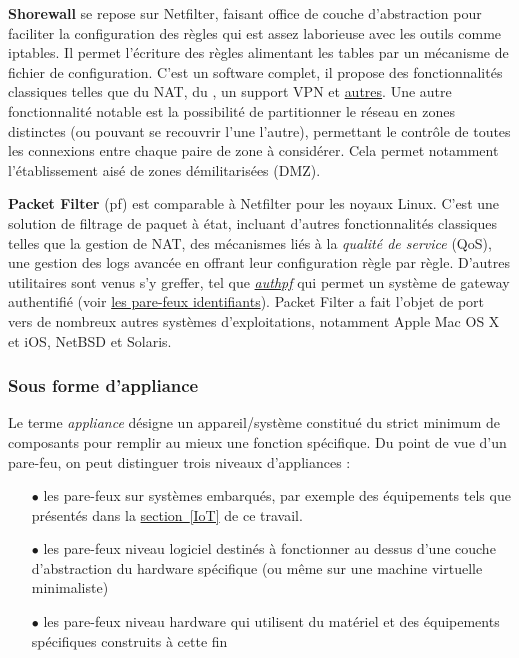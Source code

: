 \documentclass[]{article}
\newcommand{\minit}[1]{\noindent{\small\textbf{ \underline{#1}}}\vspace{0.2cm}}
\newcommand{\wordlink}[2]{\hyperref[#1]{#2~\ref{#1}}}
\begin{document}
\par \textbf{Shorewall} se repose sur Netfilter, faisant office de couche d'abstraction pour faciliter la configuration des règles qui est assez laborieuse avec les outils comme iptables. Il permet l'écriture des règles alimentant les tables par un mécanisme de fichier de configuration. C'est un software complet, il propose des fonctionnalités classiques telles que du NAT, du , un support VPN et \href{http://www.shorewall.net/shorewall_features.htm}{autres}. Une autre fonctionnalité notable est la possibilité de partitionner le réseau en zones distinctes (ou pouvant se recouvrir l'une l'autre), permettant le contrôle de toutes les connexions entre chaque paire de zone à considérer. Cela permet notamment l'établissement aisé de zones démilitarisées (DMZ).\\ 

\minit{BSD}  

\par \textbf{Packet Filter} (pf) est comparable à Netfilter pour les noyaux Linux. C'est une solution de filtrage de paquet à état, incluant d'autres fonctionnalités classiques telles que la gestion de NAT, des mécanismes liés à la \textit{qualité de service} (QoS), une gestion des logs avancée en offrant leur configuration règle par règle. D'autres utilitaires sont venus s'y greffer, tel que \href{https://www.openbsd.org/faq/pf/authpf.html}{\textit{authpf}} qui permet un système de gateway authentifié (voir \href{idfw}{les pare-feux identifiants}). Packet Filter a fait l'objet de port vers de nombreux autres systèmes d'exploitations, notamment Apple Mac OS X et iOS, NetBSD et Solaris.

\subsubsection{Sous forme d'appliance}

Le terme \textit{appliance} désigne un appareil/système constitué du strict minimum de composants pour remplir au mieux une fonction spécifique. Du point de vue d'un pare-feu, on peut distinguer trois niveaux d'appliances :
\begin{itemize}
\vspace{0.2cm}
\item[$\bullet$] les pare-feux sur systèmes embarqués, par exemple des équipements tels que présentés dans la \wordlink{IoT}{section} de ce travail. 
\vspace{0.2cm}
\item[$\bullet$] les pare-feux niveau logiciel destinés à fonctionner au dessus d'une couche d'abstraction du hardware spécifique (ou même sur une machine virtuelle minimaliste)
\vspace{0.2cm}
\item[$\bullet$] les pare-feux niveau hardware qui utilisent du matériel et des équipements spécifiques construits à cette fin
\end{itemize}
\vspace{0.2cm}
\end{document}
